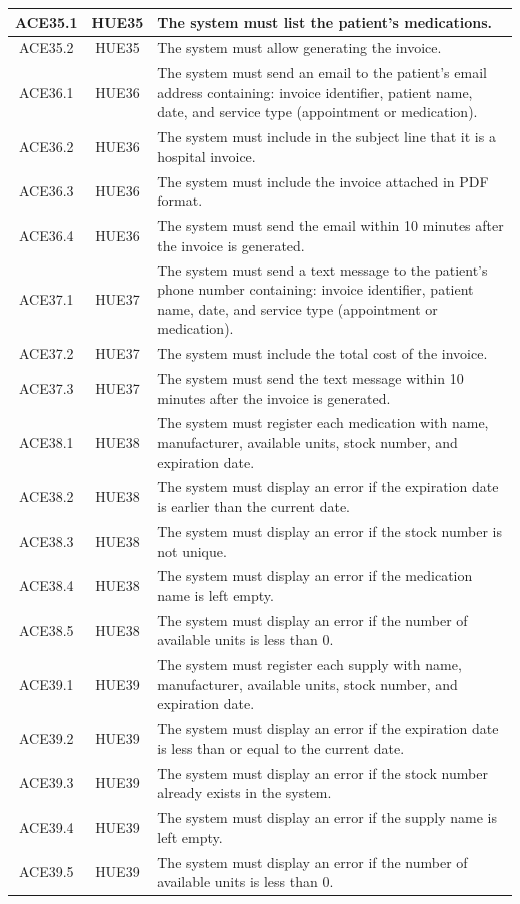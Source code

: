 \documentclass{prgrado}
\begin{document}
\begin{longtable}{|c|c|p{9cm}|}
ACE35.1 & HUE35 & The system must list the patient's medications. \\ \hline
ACE35.2 & HUE35 & The system must allow generating the invoice. \\ \hline

ACE36.1 & HUE36 & The system must send an email to the patient's email address containing: invoice identifier, patient name, date, and service type (appointment or medication). \\ \hline
ACE36.2 & HUE36 & The system must include in the subject line that it is a hospital invoice. \\ \hline
ACE36.3 & HUE36 & The system must include the invoice attached in PDF format. \\ \hline
ACE36.4 & HUE36 & The system must send the email within 10 minutes after the invoice is generated. \\ \hline

ACE37.1 & HUE37 & The system must send a text message to the patient's phone number containing: invoice identifier, patient name, date, and service type (appointment or medication). \\ \hline
ACE37.2 & HUE37 & The system must include the total cost of the invoice. \\ \hline
ACE37.3 & HUE37 & The system must send the text message within 10 minutes after the invoice is generated. \\ \hline

ACE38.1 & HUE38 & The system must register each medication with name, manufacturer, available units, stock number, and expiration date. \\ \hline
ACE38.2 & HUE38 & The system must display an error if the expiration date is earlier than the current date. \\ \hline
ACE38.3 & HUE38 & The system must display an error if the stock number is not unique. \\ \hline
ACE38.4 & HUE38 & The system must display an error if the medication name is left empty. \\ \hline
ACE38.5 & HUE38 & The system must display an error if the number of available units is less than 0. \\ \hline

ACE39.1 & HUE39 & The system must register each supply with name, manufacturer, available units, stock number, and expiration date. \\ \hline
ACE39.2 & HUE39 & The system must display an error if the expiration date is less than or equal to the current date. \\ \hline
ACE39.3 & HUE39 & The system must display an error if the stock number already exists in the system. \\ \hline
ACE39.4 & HUE39 & The system must display an error if the supply name is left empty. \\ \hline
ACE39.5 & HUE39 & The system must display an error if the number of available units is less than 0. \\ \hline


\end{longtable}
\end{document}
